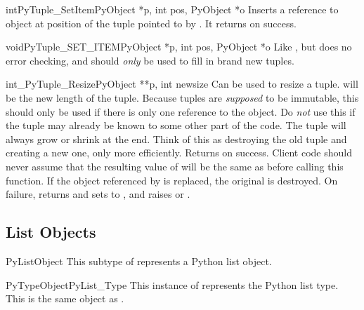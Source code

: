 \begin{cfuncdesc}{int}{PyTuple_SetItem}{PyObject *p,
                                        int pos, PyObject *o}
  Inserts a reference to object  at position  of the
  tuple pointed to by . It returns  on success.
\end{cfuncdesc}

\begin{cfuncdesc}{void}{PyTuple_SET_ITEM}{PyObject *p,
                                          int pos, PyObject *o}
  Like , but does no error checking, and
  should \emph{only} be used to fill in brand new tuples.  
\end{cfuncdesc}

\begin{cfuncdesc}{int}{_PyTuple_Resize}{PyObject **p, int newsize}
  Can be used to resize a tuple.   will be the new length
  of the tuple.  Because tuples are \emph{supposed} to be immutable,
  this should only be used if there is only one reference to the
  object.  Do \emph{not} use this if the tuple may already be known to
  some other part of the code.  The tuple will always grow or shrink
  at the end.  Think of this as destroying the old tuple and creating
  a new one, only more efficiently.  Returns  on success.
  Client code should never assume that the resulting value of
   will be the same as before calling this function.
  If the object referenced by  is replaced, the
  original  is destroyed.  On failure, returns
   and sets  to \NULL{}, and raises
   or
  .
\end{cfuncdesc}


\subsection{List Objects \label{listObjects}}

\begin{ctypedesc}{PyListObject}
  This subtype of  represents a Python list object.
\end{ctypedesc}

\begin{cvardesc}{PyTypeObject}{PyList_Type}
  This instance of  represents the Python list
  type.  This is the same object as .
\end{cvardesc}

